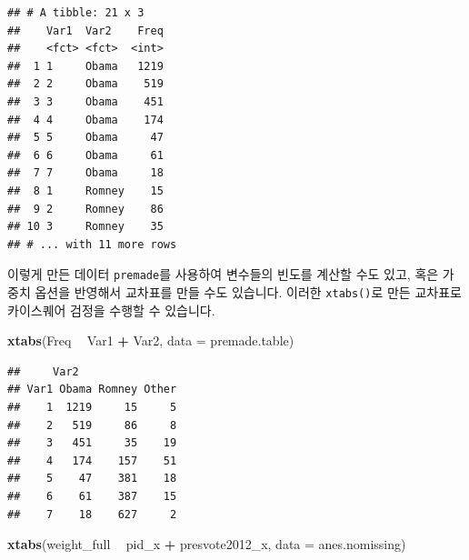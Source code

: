 \documentclass[]{book}
\newenvironment{Shaded}{\begin{snugshade}}{\end{snugshade}}
\newcommand{\CommentTok}[1]{\textcolor[rgb]{0.56,0.35,0.01}{\textit{#1}}}
\newcommand{\DataTypeTok}[1]{\textcolor[rgb]{0.13,0.29,0.53}{#1}}
\newcommand{\KeywordTok}[1]{\textcolor[rgb]{0.13,0.29,0.53}{\textbf{#1}}}
\newcommand{\NormalTok}[1]{#1}
\newcommand{\OperatorTok}[1]{\textcolor[rgb]{0.81,0.36,0.00}{\textbf{#1}}}
\newcommand{\StringTok}[1]{\textcolor[rgb]{0.31,0.60,0.02}{#1}}
\begin{document}
\begin{Shaded}
\end{Shaded}

\begin{verbatim}
## # A tibble: 21 x 3
##    Var1  Var2    Freq
##    <fct> <fct>  <int>
##  1 1     Obama   1219
##  2 2     Obama    519
##  3 3     Obama    451
##  4 4     Obama    174
##  5 5     Obama     47
##  6 6     Obama     61
##  7 7     Obama     18
##  8 1     Romney    15
##  9 2     Romney    86
## 10 3     Romney    35
## # ... with 11 more rows
\end{verbatim}

이렇게 만든 데이터 \texttt{premade}를 사용하여 변수들의 빈도를 계산할 수도 있고, 혹은 가중치 옵션을 반영해서 교차표를 만들 수도 있습니다. 이러한 \texttt{xtabs()}로 만든 교차표로 카이스퀘어 검정을 수행할 수 있습니다.

\begin{Shaded}
\begin{Highlighting}[]
\KeywordTok{xtabs}\NormalTok{(Freq }\OperatorTok{~}\StringTok{ }\NormalTok{Var1 }\OperatorTok{+}\StringTok{ }\NormalTok{Var2, }\DataTypeTok{data =}\NormalTok{ premade.table)}
\end{Highlighting}
\end{Shaded}

\begin{verbatim}
##     Var2
## Var1 Obama Romney Other
##    1  1219     15     5
##    2   519     86     8
##    3   451     35    19
##    4   174    157    51
##    5    47    381    18
##    6    61    387    15
##    7    18    627     2
\end{verbatim}

\begin{Shaded}
\begin{Highlighting}[]
\KeywordTok{xtabs}\NormalTok{(weight_full }\OperatorTok{~}\StringTok{ }\NormalTok{pid_x }\OperatorTok{+}\StringTok{ }\NormalTok{presvote2012_x, }\DataTypeTok{data =}\NormalTok{ anes.nomissing)}
\end{Highlighting}
\end{Shaded}
\end{document}
